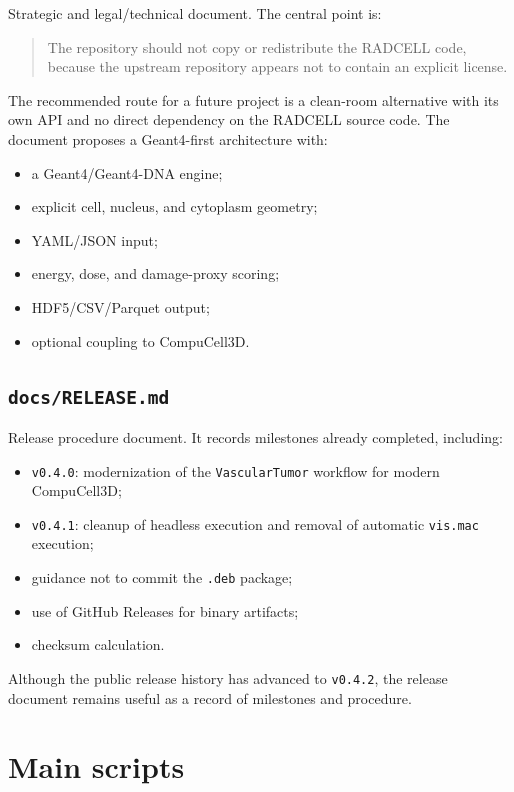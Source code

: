 \documentclass[11pt,a4paper,twoside,pdftex]{refrep}
\begin{document}
Strategic and legal/technical document. The central point is:

\begin{quote}
The repository should not copy or redistribute the RADCELL code, because the upstream repository appears not to contain an explicit license.
\end{quote}

The recommended route for a future project is a clean-room alternative with its own API and no direct dependency on the RADCELL source code. The document proposes a Geant4-first architecture with:

\begin{itemize}
  \item a Geant4/Geant4-DNA engine;
  \item explicit cell, nucleus, and cytoplasm geometry;
  \item YAML/JSON input;
  \item energy, dose, and damage-proxy scoring;
  \item HDF5/CSV/Parquet output;
  \item optional coupling to CompuCell3D.
\end{itemize}

\section{\texttt{docs/RELEASE.md}}

Release procedure document. It records milestones already completed, including:

\begin{itemize}
  \item \texttt{v0.4.0}: modernization of the \texttt{VascularTumor} workflow for modern CompuCell3D;
  \item \texttt{v0.4.1}: cleanup of headless execution and removal of automatic \texttt{vis.mac} execution;
  \item guidance not to commit the \texttt{.deb} package;
  \item use of GitHub Releases for binary artifacts;
  \item checksum calculation.
\end{itemize}

Although the public release history has advanced to \texttt{v0.4.2}, the release document remains useful as a record of milestones and procedure.

\chapter{Main scripts}
\end{document}
